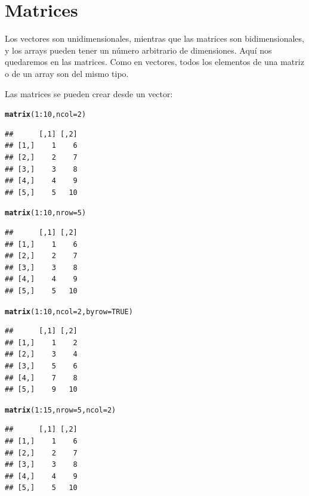 \documentclass{config/apuntes}\usepackage[]{graphicx}\usepackage[]{xcolor}
\makeatletter
\newcommand{\hlnum}[1]{\textcolor[rgb]{0.686,0.059,0.569}{#1}}%
\newcommand{\hlopt}[1]{\textcolor[rgb]{0,0,0}{#1}}%
\newcommand{\hldef}[1]{\textcolor[rgb]{0.345,0.345,0.345}{#1}}%
\newcommand{\hlkwc}[1]{\textcolor[rgb]{0.333,0.667,0.333}{#1}}%
\newcommand{\hlkwd}[1]{\textcolor[rgb]{0.737,0.353,0.396}{\textbf{#1}}}%
\newenvironment{kframe}{%
 \def\at@end@of@kframe{}%
 \ifinner\ifhmode%
  \def\at@end@of@kframe{\end{minipage}}%
  \begin{minipage}{\columnwidth}%
 \fi\fi%
 \def\FrameCommand##1{\hskip\@totalleftmargin \hskip-\fboxsep
 \colorbox{shadecolor}{##1}\hskip-\fboxsep
     \hskip-\linewidth \hskip-\@totalleftmargin \hskip\columnwidth}%
 \MakeFramed {\advance\hsize-\width
   \@totalleftmargin\z@ \linewidth\hsize
   \@setminipage}}%
 {\par\unskip\endMakeFramed%
 \at@end@of@kframe}
\newenvironment{knitrout}{}{} %
\makeatother
\begin{document}
\section{Matrices}
Los vectores son unidimensionales, mientras que las matrices son bidimensionales, y los arrays pueden tener un número arbitrario de dimensiones. Aquí nos quedaremos en las matrices. Como en vectores, todos los elementos de una matriz o de un array son del mismo tipo. 

Las matrices se pueden crear desde un vector:
\begin{knitrout}
\color{fgcolor}\begin{kframe}
\begin{alltt}
\hlkwd{matrix}\hldef{(}\hlnum{1}\hlopt{:}\hlnum{10}\hldef{,} \hlkwc{ncol} \hldef{=} \hlnum{2}\hldef{)}
\end{alltt}
\begin{verbatim}
##      [,1] [,2]
## [1,]    1    6
## [2,]    2    7
## [3,]    3    8
## [4,]    4    9
## [5,]    5   10
\end{verbatim}
\begin{alltt}
\hlkwd{matrix}\hldef{(}\hlnum{1}\hlopt{:}\hlnum{10}\hldef{,} \hlkwc{nrow} \hldef{=} \hlnum{5}\hldef{)}
\end{alltt}
\begin{verbatim}
##      [,1] [,2]
## [1,]    1    6
## [2,]    2    7
## [3,]    3    8
## [4,]    4    9
## [5,]    5   10
\end{verbatim}
\begin{alltt}
\hlkwd{matrix}\hldef{(}\hlnum{1}\hlopt{:}\hlnum{10}\hldef{,} \hlkwc{ncol} \hldef{=} \hlnum{2}\hldef{,} \hlkwc{byrow} \hldef{=} \hlnum{TRUE}\hldef{)}
\end{alltt}
\begin{verbatim}
##      [,1] [,2]
## [1,]    1    2
## [2,]    3    4
## [3,]    5    6
## [4,]    7    8
## [5,]    9   10
\end{verbatim}
\begin{alltt}
\hlkwd{matrix}\hldef{(}\hlnum{1}\hlopt{:}\hlnum{15}\hldef{,} \hlkwc{nrow} \hldef{=} \hlnum{5}\hldef{,} \hlkwc{ncol} \hldef{=} \hlnum{2}\hldef{)}
\end{alltt}


{\ttfamily\noindent\color{warningcolor}{\#\# Warning in matrix(1:15, nrow = 5, ncol = 2): data length [15] is not a sub-multiple or multiple of the number of columns [2]}}\begin{verbatim}
##      [,1] [,2]
## [1,]    1    6
## [2,]    2    7
## [3,]    3    8
## [4,]    4    9
## [5,]    5   10
\end{verbatim}
\end{kframe}
\end{knitrout}
\end{document}
